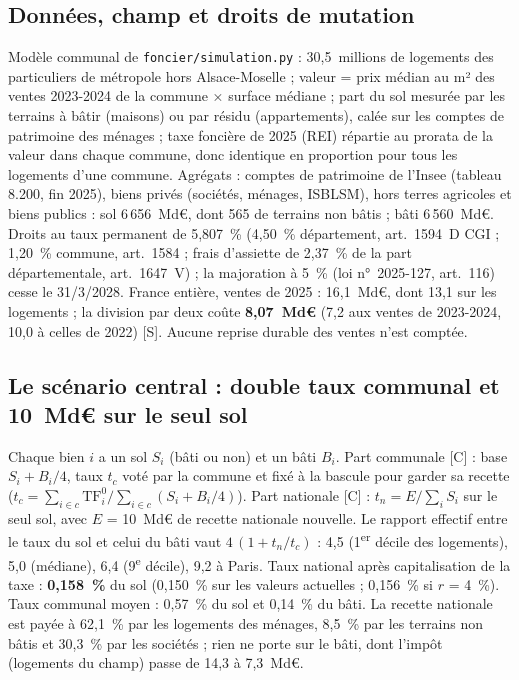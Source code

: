 
\subsection{Données, champ et droits de mutation}

Modèle communal de \texttt{foncier/simulation.py} : 30,5~millions de logements des particuliers de métropole hors
Alsace-Moselle ; valeur = prix médian au m² des ventes 2023-2024 de la commune × surface médiane ; part du sol mesurée
par les terrains à bâtir (maisons) ou par résidu (appartements), calée sur les comptes de patrimoine des ménages ; taxe
foncière de 2025 (REI) répartie au prorata de la valeur dans chaque commune, donc identique en proportion pour tous les
logements d'une commune. Agrégats : comptes de patrimoine de l'Insee (tableau 8.200, fin 2025), biens privés (sociétés,
ménages, ISBLSM), hors terres agricoles et biens publics : sol 6\,656~Md€, dont
565 de terrains non bâtis ; bâti 6\,560~Md€. Droits au taux permanent de
5,807~\% (4,50~\% département, art.~1594~D CGI ; 1,20~\% commune, art.~1584 ; frais d'assiette de 2,37~\% de la part
départementale, art.~1647~V) ; la majoration à 5~\% (loi n°~2025-127, art.~116) cesse le 31/3/2028. France entière,
ventes de 2025 : 16,1~Md€, dont 13,1 sur les logements ; la division par deux
coûte \textbf{8,07~Md€} (7,2 aux ventes de 2023-2024, 10,0 à celles de 2022) [S]. Aucune reprise durable
des ventes n'est comptée.

\subsection{Le scénario central : double taux communal et 10~Md€ sur le seul sol}

Chaque bien $i$ a un sol $S_i$ (bâti ou non) et un bâti $B_i$. Part communale [C] : base $S_i + B_i/4$, taux $t_c$ voté
par la commune et fixé à la bascule pour garder sa recette ($t_c = \sum_{i\in c}\mathrm{TF}_i^0/\sum_{i\in c}(S_i+B_i/4)$).
Part nationale [C] : $t_n = E/\sum_i S_i$ sur le seul sol, avec $E$ = 10~Md€ de recette nationale nouvelle. Le rapport
effectif entre le taux du sol et celui du bâti vaut $4\,(1 + t_n/t_c)$ : 4,5 (1\textsuperscript{er} décile
des logements), 5,0 (médiane), 6,4 (9\textsuperscript{e}
décile), 9,2 à Paris. Taux national après capitalisation de la taxe : \textbf{0,158~\%}
du sol (0,150~\% sur les valeurs actuelles ; 0,156~\% si $r$ = 4~\%).
Taux communal moyen : 0,57~\% du sol et 0,14~\% du bâti. La recette nationale est payée
à 62,1~\% par les logements des ménages, 8,5~\% par les terrains non bâtis et
30,3~\% par les sociétés ; rien ne porte sur le bâti, dont l'impôt (logements du champ) passe de
14,3 à 7,3~Md€.

